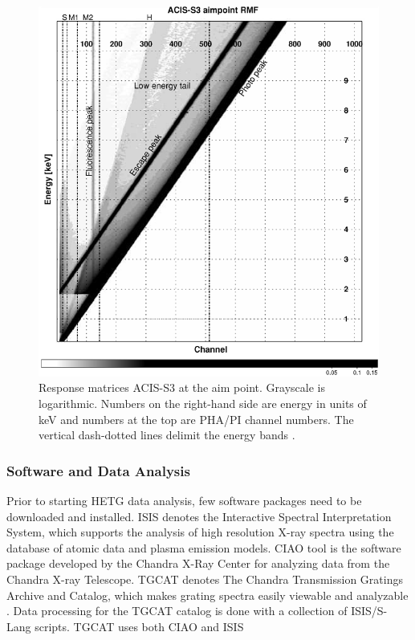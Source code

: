 \begin{figure}[ht!]
    \centering
    \includegraphics[width = 0.7\linewidth]{Chapters/Figures/rmf.png}
    \caption{Response matrices ACIS-S3 at the aim point. Grayscale is logarithmic. Numbers on the right-hand side are energy in units of keV and numbers at the top are PHA/PI channel numbers. The vertical dash-dotted lines delimit the energy bands \citep{Grimm2009}.}
    \label{rmf}
\end{figure}


\subsubsection{Software and Data Analysis}

Prior to starting HETG data analysis, few software packages need to be downloaded and installed. ISIS \citep{Houck2000} denotes the Interactive Spectral Interpretation System, which supports the analysis of high resolution X-ray spectra using the database of atomic data and plasma emission models. CIAO tool \citep{CIAO2006} is the software package developed by the Chandra X-Ray Center for analyzing data from the Chandra X-ray Telescope. TGCAT denotes The Chandra Transmission Gratings Archive and Catalog, which makes grating spectra easily viewable and analyzable \citep{Huenemoerder2011}. Data processing for the TGCAT catalog is done with a collection of ISIS/S-Lang scripts. TGCAT uses both CIAO and ISIS\par

